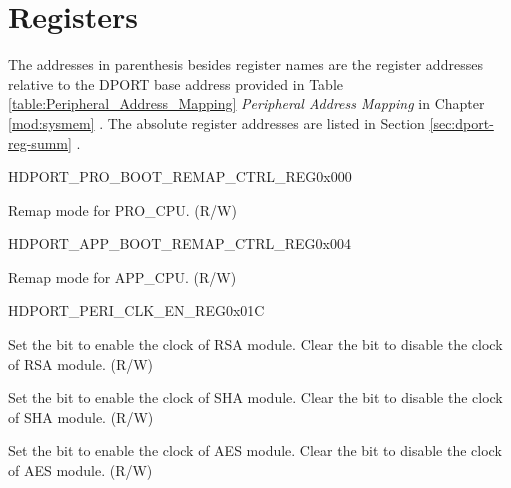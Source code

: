 \section{Registers}\label{sec:dport-reg}

The addresses in parenthesis besides register names are the register addresses relative to the DPORT base address provided in Table \ref{table:Peripheral_Address_Mapping} \textit{Peripheral Address Mapping} in Chapter \ref{mod:sysmem} \textit{}. The absolute register addresses are listed in Section \ref{sec:dport-reg-summ} \textit{}. 

\begin{register}{H}{DPORT\_PRO\_BOOT\_REMAP\_CTRL\_REG}{0x000}\label{regdesc:PROBOOTREMAPCTRLREG}
%
%
\regnewline%
\begin{regdesc}\begin{reglist}
\item [DPORT\_PRO\_BOOT\_REMAP]Remap mode for PRO\_CPU. (R/W)
\end{reglist}\end{regdesc}
\end{register}


\begin{register}{H}{DPORT\_APP\_BOOT\_REMAP\_CTRL\_REG}{0x004}\label{regdesc:APPBOOTREMAPCTRLREG}
%
%
\regnewline%
\begin{regdesc}\begin{reglist}
\item [DPORT\_APP\_BOOT\_REMAP]Remap mode for APP\_CPU. (R/W)
\end{reglist}\end{regdesc}
\end{register}


\begin{register}{H}{DPORT\_PERI\_CLK\_EN\_REG}{0x01C}\label{regdesc:PERICLKENREG}
%
%
%
%
\regnewline%
\begin{regdesc}\begin{reglist}
\item [DPORT\_PERI\_EN\_RSA] Set the bit to enable the clock of RSA module. Clear the bit to disable the clock of RSA module. (R/W)
\item [DPORT\_PERI\_EN\_SHA] Set the bit to enable the clock of SHA module. Clear the bit to disable the clock of SHA module. (R/W)
\item [DPORT\_PERI\_EN\_AES] Set the bit to enable the clock of AES module. Clear the bit to disable the clock of AES module. (R/W)
\end{reglist}\end{regdesc}
\end{register}


